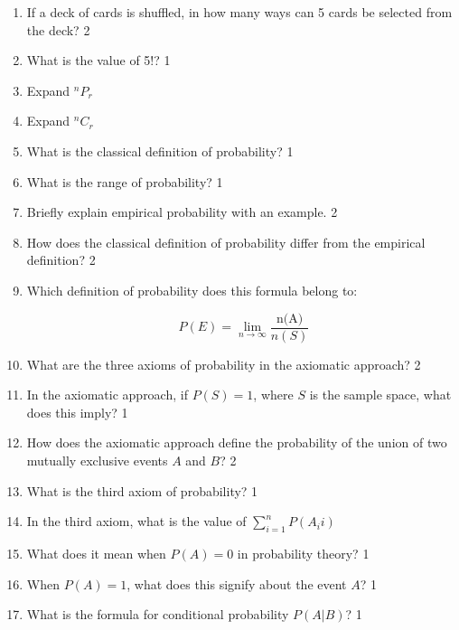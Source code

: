 \documentclass[a4paper,oneside, margin=1.4in]{book}
\begin{document}
\begin{enumerate}
\item If a deck of cards is shuffled, in how many ways can 5 cards be selected from the deck? \hfill 2

\item What is the value of 5!? \hfill 1

\item Expand ${}^nP_r$

\item Expand ${}^nC_r$

\item What is the classical definition of probability? \hfill 1

\item What is the range of probability? \hfill 1

\item Briefly explain empirical probability with an example. \hfill 2

\item How does the classical definition of probability differ from the empirical definition? \hfill 2

\item Which definition of probability does this formula belong to: 

\[
P(E) = \lim_{n \to \infty} \frac{\text{n(A)}}{n(S)}
\]

\item What are the three axioms of probability in the axiomatic approach? \hfill 2

\item In the axiomatic approach, if \( P(S) = 1 \), where \( S \) is the sample space, what does this imply? \hfill 1

\item How does the axiomatic approach define the probability of the union of two mutually exclusive events \( A \) and \( B \)? \hfill 2

\item What is the third axiom of probability? \hfill 1

\item In the third axiom, what is the value of $\displaystyle \sum_{i=1}^n P(A_ii)$

\item What does it mean when \( P(A) = 0 \) in probability theory? \hfill 1

\item When \( P(A) = 1 \), what does this signify about the event \( A \)? \hfill 1

\item What is the formula for conditional probability \( P(A|B) \)? \hfill 1


\end{enumerate}
\end{document}
